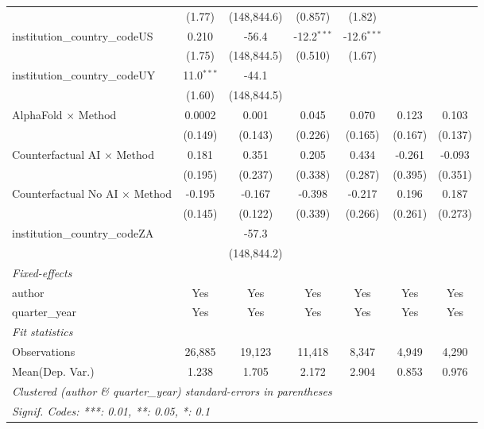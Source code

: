 \begin{tabular}{lcccccc}
                                         & (1.77)        & (148,844.6)   & (0.857)       & (1.82)        &               &   \\   
   institution\_country\_codeUS          & 0.210         & -56.4         & -12.2$^{***}$ & -12.6$^{***}$ &               &   \\   
                                         & (1.75)        & (148,844.5)   & (0.510)       & (1.67)        &               &   \\   
   institution\_country\_codeUY          & 11.0$^{***}$  & -44.1         &               &               &               &   \\   
                                         & (1.60)        & (148,844.5)   &               &               &               &   \\   
   AlphaFold $\times$ Method             & 0.0002        & 0.001         & 0.045         & 0.070         & 0.123         & 0.103\\   
                                         & (0.149)       & (0.143)       & (0.226)       & (0.165)       & (0.167)       & (0.137)\\   
   Counterfactual AI $\times$ Method     & 0.181         & 0.351         & 0.205         & 0.434         & -0.261        & -0.093\\   
                                         & (0.195)       & (0.237)       & (0.338)       & (0.287)       & (0.395)       & (0.351)\\   
   Counterfactual No AI $\times$ Method  & -0.195        & -0.167        & -0.398        & -0.217        & 0.196         & 0.187\\   
                                         & (0.145)       & (0.122)       & (0.339)       & (0.266)       & (0.261)       & (0.273)\\   
   institution\_country\_codeZA          &               & -57.3         &               &               &               &   \\   
                                         &               & (148,844.2)   &               &               &               &   \\   
   \midrule
   \emph{Fixed-effects}\\
   author                                & Yes           & Yes           & Yes           & Yes           & Yes           & Yes\\  
   quarter\_year                         & Yes           & Yes           & Yes           & Yes           & Yes           & Yes\\  
   \midrule
   \emph{Fit statistics}\\
   Observations                          & 26,885        & 19,123        & 11,418        & 8,347         & 4,949         & 4,290\\  
Mean(Dep. Var.) & 1.238 & 1.705 & 2.172 & 2.904 & 0.853 & 0.976 \\
   \midrule \midrule
   \multicolumn{7}{l}{\emph{Clustered (author \& quarter\_year) standard-errors in parentheses}}\\
   \multicolumn{7}{l}{\emph{Signif. Codes: ***: 0.01, **: 0.05, *: 0.1}}\\
\end{tabular}
\par\endgroup
